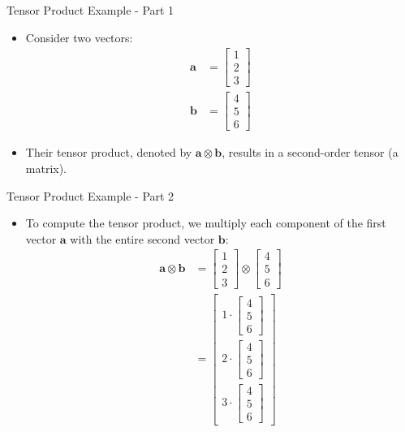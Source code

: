 \documentclass{beamer}
\begin{document}
\begin{frame}{Tensor Product Example - Part 1}
\begin{itemize}
\item Consider two vectors:
\begin{align*}
\mathbf{a} &= \begin{bmatrix} 1 \\ 2 \\ 3 \end{bmatrix} \\
\mathbf{b} &= \begin{bmatrix} 4 \\ 5 \\ 6 \end{bmatrix}
\end{align*}
\item Their tensor product, denoted by $\mathbf{a} \otimes \mathbf{b}$, results in a second-order tensor (a matrix). 
\end{itemize}
\end{frame}

\begin{frame}{Tensor Product Example - Part 2}
\begin{itemize}
\item To compute the tensor product, we multiply each component of the first vector $\mathbf{a}$ with the entire second vector $\mathbf{b}$:
\begin{align*}
\mathbf{a} \otimes \mathbf{b} &= \begin{bmatrix} 1 \\ 2 \\ 3 \end{bmatrix} \otimes \begin{bmatrix} 4 \\ 5 \\ 6 \end{bmatrix} \\
&= \begin{bmatrix} 1 \cdot \begin{bmatrix} 4 \\ 5 \\ 6 \end{bmatrix} \\ 2 \cdot \begin{bmatrix} 4 \\ 5 \\ 6 \end{bmatrix} \\ 3 \cdot \begin{bmatrix} 4 \\ 5 \\ 6 \end{bmatrix} \end{bmatrix} 
\end{align*}
\end{itemize}
\end{frame}
\end{document}
